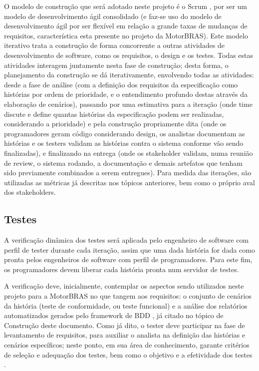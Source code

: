 \documentclass[12pt,journal,compsoc]{IEEEtran}
\begin{document}
O modelo de construção que será adotado neste projeto é o Scrum \cite{schwaber_scrum_2013}, por ser um modelo de desenvolvimento ágil consolidado (e faz-se uso do modelo de desenvolvimento ágil por ser flexível em relação a grande taxas de mudanças de requisitos, característica esta presente no projeto da MotorBRAS). Este modelo iterativo trata a construção de forma concorrente a outras atividades de desenvolvimento de software, como os requisitos, o design e os testes. Todas estas atividades interagem juntamente nesta fase de construção; desta forma, o planejamento da construção se dá iterativamente, envolvendo todas as atividades: desde a fase de análise (com a definição dos requisitos da especificação como histórias por ordem de prioridade, e o entendimento profundo destas através da elaboração de cenários), passando por  uma estimativa para a iteração (onde time discute e define quantas histórias da especificação podem ser realizadas, considerando a prioridade) e pela construção propriamente dita (onde os programadores geram código considerando design, os analistas documentam as histórias e os testers validam as histórias contra o sistema conforme vão sendo finalizadas), e finalizando na entrega (onde os stakeholder validam, numa reunião de review, o sistema rodando, a documentação e demais artefatos que tenham sido previamente combinados a serem entregues).  Para medida das iterações, são utilizadas as métricas já descritas nos tópicos anteriores, bem como o próprio aval dos stakeholders.


\subsection{Testes}

A verificação dinâmica dos testes será aplicada pelo engenheiro de software com perfil de tester durante cada iteração, assim que uma dada história for dada como pronta pelos engenheiros de software com perfil de programadores. Para este fim, os programadores devem liberar cada história pronta num servidor de testes.

A verificação deve, inicialmente, contemplar os aspectos sendo utilizados neste projeto para a MotorBRAS no que tangem aos requisitos: o conjunto de cenários da história (teste de conformidade, ou teste funcional) e a análise dos relatórios automatizados gerados pelo framework de BDD \cite{chelimsky2010rspec}, já citado no tópico de Construção deste documento. Como já dito, o tester deve participar na fase de levantamento de requisitos, para auxiliar o analista na definição das histórias e cenários específicos; neste ponto, em sua área de conhecimento, garante critérios de seleção e adequação dos testes, bem como o objetivo e a efetividade dos testes \cite{agile_testing}. 
\end{document}
